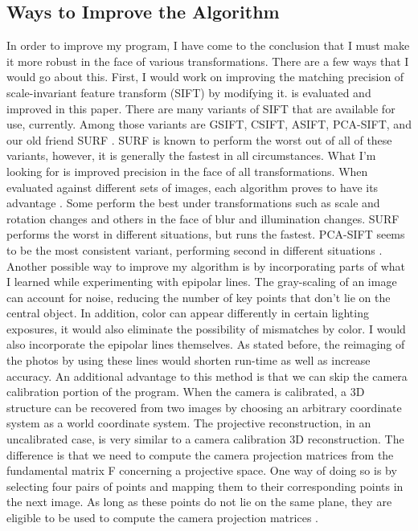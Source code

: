 \documentclass[10pt,twocolumn]{article}
\begin{document}
\subsection{Ways to Improve the Algorithm}
In order to improve my program, I have come to the conclusion that I must make it more robust in the face of various transformations. There are a few ways that I would go about this. 
First, I would work on improving the matching precision of scale-invariant feature transform (SIFT) by modifying it. is evaluated and improved in this paper. There are many variants of SIFT that are available for use, currently. Among those variants are GSIFT, CSIFT, ASIFT, PCA-SIFT, and our old friend SURF \cite{wu2013comparative}. SURF is known to perform the worst out of all of these variants, however, it is generally the fastest in all circumstances. What I’m looking for is improved precision in the face of all transformations. When evaluated against different sets of images, each algorithm proves to have its
advantage \cite{wu2013comparative}. Some perform the best under transformations such as scale and rotation changes and others in the face of blur and illumination changes. SURF performs
the worst in different situations, but runs the fastest. PCA-SIFT seems to be the most consistent variant, performing second in different situations \cite{wu2013comparative}. 
Another possible way to improve my algorithm is by incorporating parts of what I learned while experimenting with epipolar lines. The gray-scaling of an image can account for noise, reducing the number of key points that don't lie on the central object. In addition, color can appear differently in certain lighting exposures, it would also eliminate the possibility of mismatches by color. I would also incorporate the epipolar lines themselves. As stated before, the reimaging of the photos by using these lines would shorten run-time as well as increase accuracy. 
An additional advantage to this method is that we can skip the camera calibration portion of the program. When the camera is calibrated, a 3D structure can be recovered from two images by choosing an arbitrary coordinate system as a world coordinate system. The projective reconstruction, in an uncalibrated case, is very similar to a camera calibration 3D reconstruction. The difference is that we need to compute the camera projection matrices from the fundamental matrix F concerning a projective space. One way of doing so is by selecting four pairs of points and mapping them to their corresponding points in the next image. As long as these points do not lie on the same plane, they are eligible to be used to compute the camera projection matrices \cite{zhang1998determining}.
\end{document}

